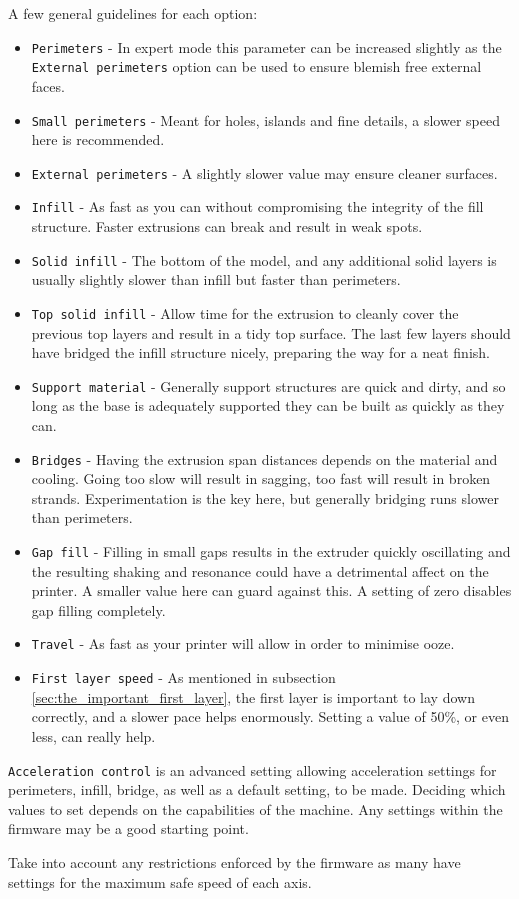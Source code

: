 A few general guidelines for each option:
\begin{itemize}
	\item \texttt{Perimeters}  - In expert mode this parameter can be increased slightly as the \texttt{External perimeters} option can be used to ensure blemish free external faces.
	\item \texttt{Small perimeters}  - Meant for holes, islands and fine details, a slower speed here is recommended.
	\item \texttt{External perimeters}  - A slightly slower value may ensure cleaner surfaces.
	\item \texttt{Infill}  - As fast as you can without compromising the integrity of the fill structure. Faster extrusions can break and result in weak spots.
	\item \texttt{Solid infill}  - The bottom of the model, and any additional solid layers is usually slightly slower than infill but faster than perimeters.
	\item \texttt{Top solid infill}  - Allow time for the extrusion to cleanly cover the previous top layers and result in a tidy top surface. The last few layers should have bridged the infill structure nicely, preparing the way for a neat finish.
	\item \texttt{Support material}  - Generally support structures are quick and dirty, and so long as the base is adequately supported they can be built as quickly as they can.
	\item \texttt{Bridges}  - Having the extrusion span distances depends on the material and cooling.  Going too slow will result in sagging, too fast will result in broken strands.  Experimentation is the key here, but generally bridging runs slower than perimeters.
	\item \texttt{Gap fill}  - Filling in small gaps results in the extruder quickly oscillating and the resulting shaking and resonance could have a detrimental affect on the printer.  A smaller value here can guard against this.  A setting of zero disables gap filling completely.
	\item \texttt{Travel}  - As fast as your printer will allow in order to minimise ooze.
	\item \texttt{First layer speed}  - As mentioned in subsection \ref{sec:the_important_first_layer}, the first layer is important to lay down correctly, and a slower pace helps enormously.  Setting a value of 50\%, or even less, can really help.
\end{itemize}

\texttt{Acceleration control} is an advanced setting allowing acceleration settings for perimeters, infill, bridge, as well as a default setting, to be made.  Deciding which values to set depends on the capabilities of the machine.  Any settings within the firmware may be a good starting point.

Take into account any restrictions enforced by the firmware as many have settings for the maximum safe speed of each axis.

